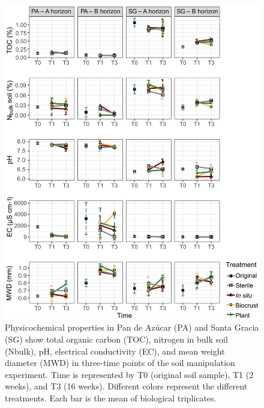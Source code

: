\begin{figure}[H]
	\centering
	\includegraphics[width=1\textwidth]{img/M3-Figure_2.jpg}
	\caption{Physicochemical properties in Pan de Azúcar (PA) and Santa Gracia (SG) show total organic carbon (TOC), nitrogen in bulk soil (Nbulk), pH, electrical conductivity (EC), and mean weight diameter (MWD) in three-time points of the soil manipulation experiment. Time is represented by T0 (original soil sample), T1 (2 weeks), and T3 (16 weeks). Different colors represent the different treatments. Each bar is the mean of biological triplicates.}
	\label{fig:M3-F2}
\end{figure}

